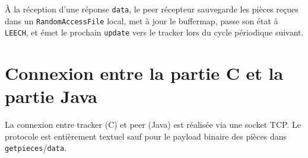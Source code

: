 \documentclass[12pt,a4paper]{article}
\begin{document}





À la réception d'une réponse \texttt{data}, le peer récepteur sauvegarde les
pièces reçues dans un \texttt{RandomAccessFile} local, met à jour le buffermap,
passe son état à \texttt{LEECH}, et émet le prochain \texttt{update} vers le
tracker lors du cycle périodique suivant.

\section{Connexion entre la partie C et la partie Java}

La connexion entre tracker (C) et peer (Java) est réalisée via une socket TCP. Le protocole est entièrement textuel sauf pour le payload binaire des
pièces dans \texttt{getpieces}/\texttt{data}.
\end{document}

